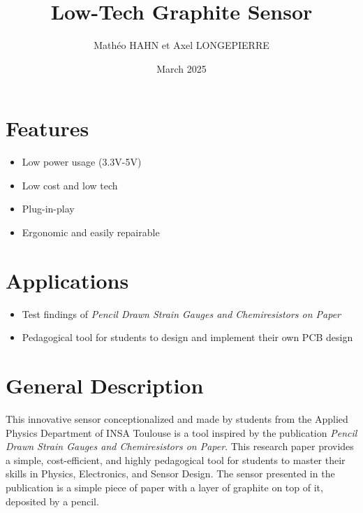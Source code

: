 \documentclass[10pt]{datasheet}
\title{Low-Tech Graphite Sensor}
\author{Mathéo HAHN et Axel LONGEPIERRE}
\date{March 2025}
\begin{document}
\maketitle


\section{Features}

\begin{itemize}
\item{Low power usage (3.3V-5V)}
\item{Low cost and low tech}
\item{Plug-in-play}
\item{Ergonomic and easily repairable}
\end{itemize}

\section{Applications}

\begin{itemize}
\item{Test findings of \it{Pencil Drawn Strain Gauges and Chemiresistors on Paper}\footnotemark{}}
\item{Pedagogical tool for students to design and implement their own PCB design}
\end{itemize}

\section{General Description}
This innovative sensor conceptionalized and made by students from the Applied Physics Department of INSA Toulouse is a tool inspired by the publication 
\textit{Pencil Drawn Strain Gauges and Chemiresistors on Paper}\footnotemark[\value{footnote}]. This research paper provides a simple, cost-efficient, and highly pedagogical tool for students 
to master their skills in Physics, Electronics, and Sensor Design. The sensor presented in the publication is a simple piece of paper with a layer of graphite 
on top of it, deposited by a pencil. 
\end{document}
